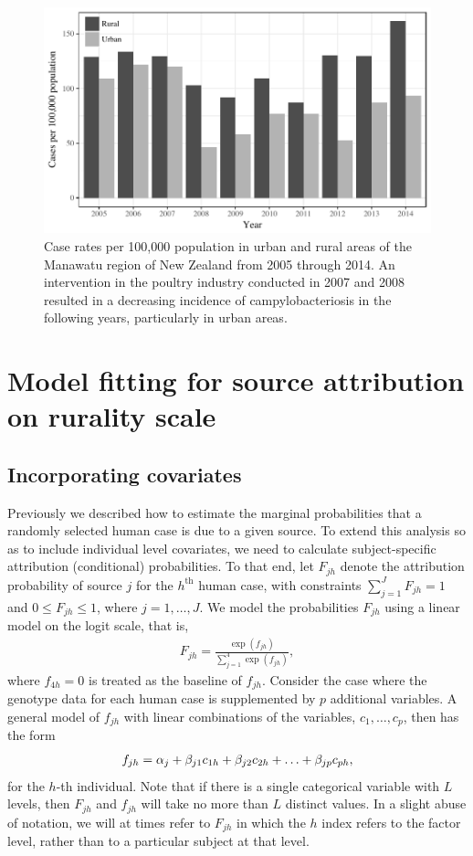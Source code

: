 \documentclass[AMA,STIX1COL]{WileyNJD-v2}
\begin{document}
\begin{figure}
  \centering
  \includegraphics[width=.8\linewidth]{figures/fig_case_rates.pdf}
  \caption{Case rates per 100,000 population in urban and rural areas of the Manawatu region of New Zealand from 2005 through 2014. An intervention in the poultry industry conducted in 2007 and 2008 resulted in a decreasing incidence of campylobacteriosis in the following years, particularly in urban areas.}
  \label{fig:case_rates}
\end{figure}

\section{Model fitting for source attribution on rurality scale}

\subsection{Incorporating covariates}

Previously we described how to estimate the marginal probabilities that a randomly selected human case is due to a given source. To extend this analysis so as to include individual level covariates, we need to calculate subject-specific attribution (conditional) probabilities. To that end, let $F_{jh}$ denote the attribution probability of source $j$ for the $h^\textrm{th}$ human case, with constraints $\sum_{j=1}^J F_{jh} =1$ and $0 \leq F_{jh} \leq 1$, where $j=1, \ldots, J$. We model the probabilities $F_{jh}$ using a linear model on the logit scale, that is,
\begin{align}
  F_{jh}  = \frac{\exp (f_{jh})}{\sum_{j=1}^4 \exp(f_{jh})},
  \label{capF}
\end{align}
where $f_{4h}=0$ is treated as the baseline of $f_{jh}$. Consider the case where the genotype data for each human case is supplemented by $p$ additional variables. A general model of $f_{jh}$ with linear combinations of the variables, $c_1, \ldots, c_p$, then has the form
\begin{align}
f_{jh}  = \alpha_{j} + \beta_{j1} c_{1h} + \beta_{j2} c_{2h} + \ldots + \beta_{jp} c_{ph},  \notag
\end{align}
for the $h$-th individual. Note that if there is a single categorical variable with $L$ levels, then $F_{jh}$ and $f_{jh}$ will take no more than $L$ distinct values. In a slight abuse of notation, we will at times refer to $F_{jh}$ in which the $h$ index refers to the factor level, rather than to a particular subject at that level.
\end{document}
